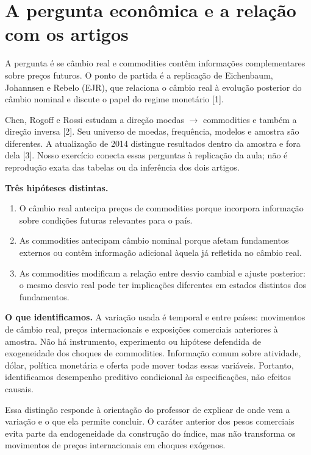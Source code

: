 \documentclass[11pt,a4paper]{article}
\begin{document}
\clearpage

\section*{A pergunta econômica e a relação com os artigos}
A pergunta é se câmbio real e commodities contêm informações complementares sobre preços futuros. O ponto de partida é a replicação de Eichenbaum, Johannsen e Rebelo (EJR), que relaciona o câmbio real à evolução posterior do câmbio nominal e discute o papel do regime monetário [1].

Chen, Rogoff e Rossi estudam a direção moedas $\rightarrow$ commodities e também a direção inversa [2]. Seu universo de moedas, frequência, modelos e amostra são diferentes. A atualização de 2014 distingue resultados dentro da amostra e fora dela [3]. Nosso exercício conecta essas perguntas à replicação da aula; não é reprodução exata das tabelas ou da inferência dos dois artigos.

\textbf{Três hipóteses distintas.}
\begin{enumerate}[itemsep=6pt]
\item O câmbio real antecipa preços de commodities porque incorpora informação sobre condições futuras relevantes para o país.
\item As commodities antecipam câmbio nominal porque afetam fundamentos externos ou contêm informação adicional àquela já refletida no câmbio real.
\item As commodities modificam a relação entre desvio cambial e ajuste posterior: o mesmo desvio real pode ter implicações diferentes em estados distintos dos fundamentos.
\end{enumerate}

\textbf{O que identificamos.} A variação usada é temporal e entre países: movimentos de câmbio real, preços internacionais e exposições comerciais anteriores à amostra. Não há instrumento, experimento ou hipótese defendida de exogeneidade dos choques de commodities. Informação comum sobre atividade, dólar, política monetária e oferta pode mover todas essas variáveis. Portanto, identificamos desempenho preditivo condicional às especificações, não efeitos causais.

Essa distinção responde à orientação do professor de explicar de onde vem a variação e o que ela permite concluir. O caráter anterior dos pesos comerciais evita parte da endogeneidade da construção do índice, mas não transforma os movimentos de preços internacionais em choques exógenos.
\end{document}
